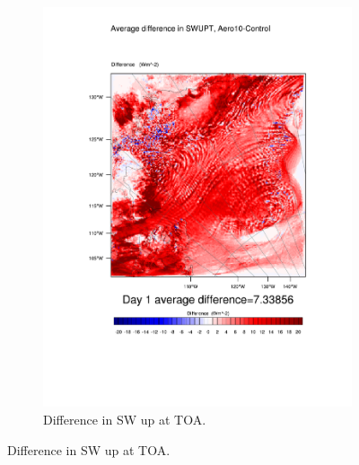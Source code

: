 \begin{figure}
\begin{subfigure}{0.48\textwidth}
		\includegraphics[width=\textwidth]{results/aero10/diff_Aero10_SWUPT_Day1.pdf}
		\caption{Difference in SW up at TOA.}
		\label{subfig:swup_r3Day1}
	\end{subfigure}
	

\end{figure}
